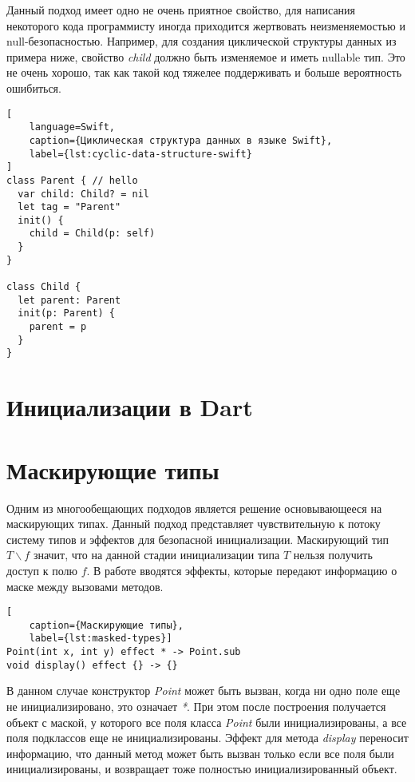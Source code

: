 Данный подход имеет одно не очень приятное свойство, для написания некоторого кода программисту иногда приходится жертвовать
неизменяемостью и null-безопасностью.
Например, для создания циклической структуры данных из примера ниже, свойство \emph{child} должно быть изменяемое и иметь nullable тип.
Это не очень хорошо, так как такой код тяжелее поддерживать и больше вероятность ошибиться.
\begin{lstlisting}[
    language=Swift,
    caption={Циклическая структура данных в языке Swift},
    label={lst:cyclic-data-structure-swift}
]
class Parent { // hello
  var child: Child? = nil
  let tag = "Parent"
  init() {
    child = Child(p: self)
  }
}

class Child {
  let parent: Parent
  init(p: Parent) {
    parent = p
  }
}
\end{lstlisting}

\section{Инициализации в Dart}\label{sec:инициализации-в-dart}



\section{Маскирующие типы}\label{sec:маскирующие-типы}

Одним из многообещающих подходов является решение основывающееся на маскирующих типах\cite{masked-types}.
Данный подход представляет чувствительную к потоку систему типов и эффектов для безопасной инициализации.
Маскирующий тип $T \backslash f$ значит, что на данной стадии инициализации типа $T$ нельзя получить доступ к полю $f$.
В работе вводятся эффекты, которые передают информацию о маске между вызовами методов.
\begin{lstlisting}[
    caption={Маскирующие типы},
    label={lst:masked-types}]
Point(int x, int y) effect * -> Point.sub
void display() effect {} -> {}
\end{lstlisting}
В данном случае конструктор \emph{Point} может быть вызван, когда ни одно поле еще не инициализировано, это означает \emph{*}.
При этом после построения получается объект с маской, у которого все поля класса \emph{Point} были инициализированы,
а все поля подклассов еще не инициализированы.
Эффект для метода \emph{display} переносит информацию, что данный метод может быть вызван только если все поля были инициализированы,
и возвращает тоже полностью инициализированный объект.

